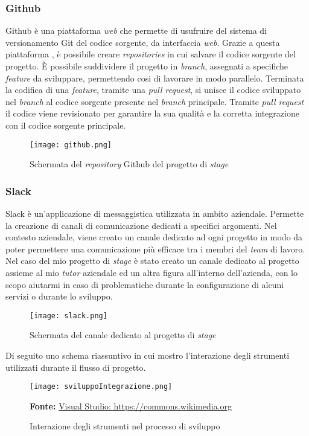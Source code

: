 \subsubsection{Github}
Github è una piattaforma \textit{web} che permette di usufruire del sistema di versionamento Git del codice sorgente, da interfaccia \textit{web}.
Grazie a questa piattaforma , è possibile creare \textit{repositories} in cui salvare il codice sorgente del progetto. 
È possibile suddividere il progetto in \textit{branch}, assegnati a specifiche \textit{feature} da sviluppare, permettendo cosi di lavorare in modo parallelo.
Terminata la codifica di una \textit{feature}, tramite una \textit{pull request}, si unisce il codice sviluppato nel \textit{branch} al codice sorgente presente nel \textit{branch} principale. Tramite \textit{pull request} il codice viene revisionato per garantire la sua qualità e la corretta integrazione con il codice sorgente principale.
\begin{figure}[H]
    \centering
    \texttt{[image: github.png]}
    \caption{Schermata del \textit{repository} Github del progetto di \textit{stage}}
    \label{fig:Github}
\end{figure}
\subsubsection{Slack}
Slack è un'applicazione di messaggistica utilizzata in ambito aziendale.
Permette la creazione di canali di comunicazione dedicati a specifici argomenti. Nel contesto aziendale, viene creato un canale dedicato ad ogni progetto in modo da poter permettere una comunicazione più efficace tra i membri del \textit{team} di lavoro.
Nel caso del mio progetto di \textit{stage} è stato creato un canale dedicato al progetto assieme al mio \textit{tutor} aziendale ed un altra figura all'interno dell'azienda, con lo scopo aiutarmi in caso di problematiche durante la configurazione di alcuni servizi o durante lo sviluppo.
\begin{figure}[H]
    \centering
    \texttt{[image: slack.png]}
    \caption{Schermata del canale dedicato al progetto di \textit{stage}}
    \label{fig:Slack}
\end{figure}
\noindent
Di seguito uno schema riassuntivo in cui mostro l'interazione degli strumenti utilizzati durante il flusso di progetto.
\begin{figure}[H]
    \centering
    \texttt{[image: sviluppoIntegrazione.png]}
    \caption{Interazione degli strumenti nel processo di sviluppo}
    \small \textbf{Fonte:} \href{https://commons.wikimedia.org/wiki/File:Visual_Studio_Code_1.35_icon.svg}{Visual Studio: https://commons.wikimedia.org}

    \label{fig:sviluppoIntegrazione}
\end{figure}

